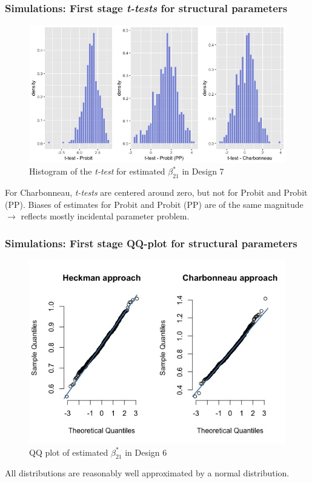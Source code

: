 \begin{frame}
    \frametitle{Simulations: First stage \textit{t-tests} for structural parameters}
    \begin{figure}
        \centerline{\includegraphics[scale=.35]{content/Figures/ttest_beta21_Design7.png}}
        \caption{\footnotesize{Histogram of the \textit{t-test} for estimated $\beta_{21}^*$ in Design 7}}
        \label{ttest_beta21_Design7}
      \end{figure}
      For Charbonneau, \textit{t-tests} are centered around zero, but not for Probit and Probit (PP). Biases of estimates for Probit and Probit (PP) are of the same magnitude $\xrightarrow{}$ reflects mostly incidental parameter problem.
\end{frame}

\begin{frame}
    \frametitle{Simulations: First stage QQ-plot for structural parameters}
    \begin{figure}
        \centerline{\includegraphics[scale=.35]{content/Figures/QQ_beta_21_Design6.png}}
        \caption{\footnotesize{QQ plot of estimated $\beta_{21}^*$ in Design 6}}
        \label{QQ_beta_21_Design6}
      \end{figure}
      All distributions are reasonably well approximated by a normal distribution.
\end{frame}

